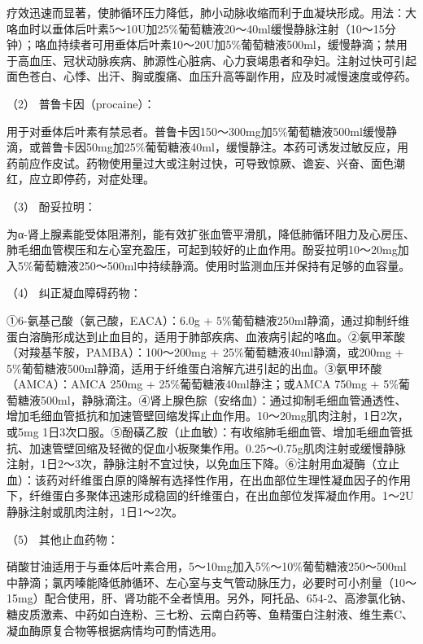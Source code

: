 疗效迅速而显著，使肺循环压力降低，肺小动脉收缩而利于血凝块形成。用法：大咯血时以垂体后叶素5～10U加25\%葡萄糖液20～40ml缓慢静脉注射（10～15分钟）；咯血持续者可用垂体后叶素10～20U加5\%葡萄糖液500ml，缓慢静滴；禁用于高血压、冠状动脉疾病、肺源性心脏病、心力衰竭患者和孕妇。注射过快可引起面色苍白、心悸、出汗、胸或腹痛、血压升高等副作用，应及时减慢速度或停药。

\hypertarget{text00024.htmlux5cux23CHP1-9-4-2-3-2}{}
（2） 普鲁卡因（procaine）：

用于对垂体后叶素有禁忌者。普鲁卡因150～300mg加5\%葡萄糖液500ml缓慢静滴，或普鲁卡因50mg加25\%葡萄糖液40ml，缓慢静注。本药可诱发过敏反应，用药前应作皮试。药物使用量过大或注射过快，可导致惊厥、谵妄、兴奋、面色潮红，应立即停药，对症处理。

\hypertarget{text00024.htmlux5cux23CHP1-9-4-2-3-3}{}
（3） 酚妥拉明：

为α-肾上腺素能受体阻滞剂，能有效扩张血管平滑肌，降低肺循环阻力及心房压、肺毛细血管楔压和左心室充盈压，可起到较好的止血作用。酚妥拉明10～20mg加入5\%葡萄糖液250～500ml中持续静滴。使用时监测血压并保持有足够的血容量。

\hypertarget{text00024.htmlux5cux23CHP1-9-4-2-3-4}{}
（4） 纠正凝血障碍药物：

①6-氨基己酸（氨己酸，EACA）：6.0g +
5\%葡萄糖液250ml静滴，通过抑制纤维蛋白溶酶形成达到止血目的，适用于肺部疾病、血液病引起的咯血。②氨甲苯酸（对羧基苄胺，PAMBA）：100～200mg
+ 25\%葡萄糖液40ml静滴，或200mg +
5\%葡萄糖液500ml静滴，适用于纤维蛋白溶解亢进引起的出血。③氨甲环酸（AMCA）：AMCA
250mg + 25\%葡萄糖液40ml静注；或AMCA 750mg +
5\%葡萄糖液500ml，静脉滴注。④肾上腺色腙（安络血）：通过抑制毛细血管通透性、增加毛细血管抵抗和加速管壁回缩发挥止血作用。10～20mg肌肉注射，1日2次，或5mg
1日3次口服。⑤酚磺乙胺（止血敏）：有收缩肺毛细血管、增加毛细血管抵抗、加速管壁回缩及轻微的促血小板聚集作用。0.25～0.75g肌肉注射或缓慢静脉注射，1日2～3次，静脉注射不宜过快，以免血压下降。⑥注射用血凝酶（立止血）：该药对纤维蛋白原的降解有选择性作用，在出血部位生理性凝血因子的作用下，纤维蛋白多聚体迅速形成稳固的纤维蛋白，在出血部位发挥凝血作用。1～2U静脉注射或肌肉注射，1日1～2次。

\hypertarget{text00024.htmlux5cux23CHP1-9-4-2-3-5}{}
（5） 其他止血药物：

硝酸甘油适用于与垂体后叶素合用，5～10mg加入5\%～10\%葡萄糖液250～500ml中静滴；氯丙嗪能降低肺循环、左心室与支气管动脉压力，必要时可小剂量（10～15mg）配合使用，肝、肾功能不全者慎用。另外，阿托品、654-2、高渗氯化钠、糖皮质激素、中药如白连粉、三七粉、云南白药等、鱼精蛋白注射液、维生素C、凝血酶原复合物等根据病情均可酌情选用。

